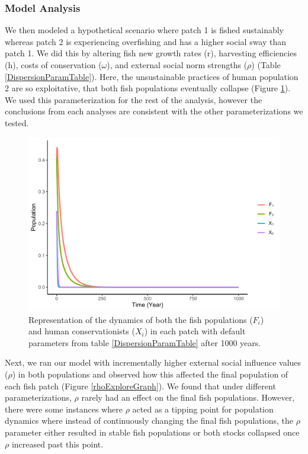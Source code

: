 \documentclass[
  12pt,
]{article}
\begin{document}
\hypertarget{model-analysis-1}{%
\subsubsection{Model Analysis}\label{model-analysis-1}}

We then modeled a hypothetical scenario where patch 1 is fished sustainably whereas patch 2 is experiencing overfishing and has a higher social sway than patch 1. We did this by altering fish new growth rates (r), harvesting efficiencies (h), costs of conservation (\(\omega\)), and external social norm strengths (\(\rho\)) (Table \ref{DispersionParamTable}). Here, the unsustainable practices of human population 2 are so exploitative, that both fish populations eventually collapse (Figure \ref{DispersionScenario}). We used this parameterization for the rest of the analysis, however the conclusions from each analyses are consistent with the other parameterizations we tested.



\begin{figure}
\centering
\includegraphics{Wulfing_Thesis_files/figure-latex/DispersionScenario-1.pdf}
\caption{\label{fig:DispersionScenario}Representation of the dynamics of both the fish populations (\(F_i\)) and human conservationists (\(X_i\)) in each patch with default parameters from table \ref{DispersionParamTable} after 1000 years. \label{DispersionScenario}}
\end{figure}

Next, we ran our model with incrementally higher external social influence values (\(\rho\)) in both populations and observed how this affected the final population of each fish patch (Figure \ref{rhoExploreGraph}). We found that under different parameterizations, \(\rho\) rarely had an effect on the final fish populations. However, there were some instances where \(\rho\) acted as a tipping point for population dynamics where instead of continuously changing the final fish populations, the \(\rho\) parameter either resulted in stable fish populations or both stocks collapsed once \(\rho\) increased past this point.
\end{document}
